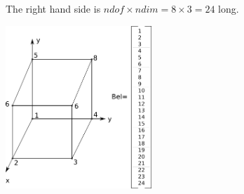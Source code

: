 The right hand side is $ndof \times ndim = 8\times 3 = 24$ long. 

\begin{center}
\includegraphics[width=5.5cm]{images/openbc/drawing3D.png}
\end{center}

